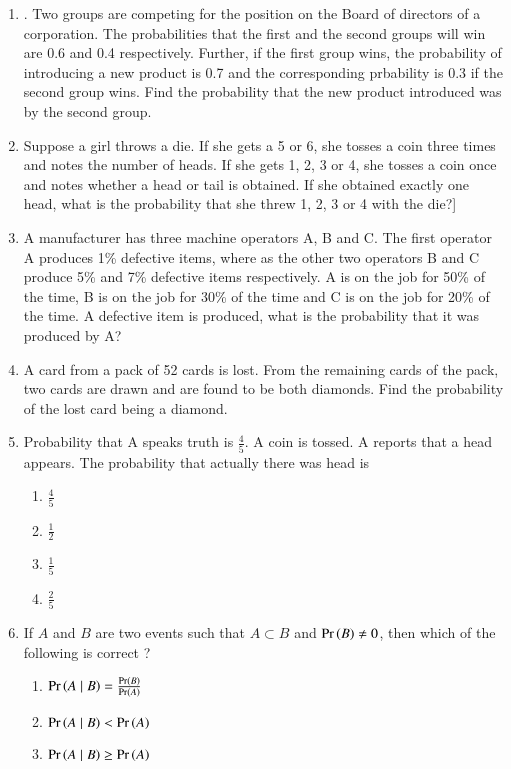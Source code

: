 \begin{enumerate}[label=\thesubsection.\arabic*,ref=\thesubsection.\theenumi]
\item. Two groups are competing for the position on the Board of directors of a
corporation. The probabilities that the first and the second groups will win are
0.6 and 0.4 respectively. Further, if the first group wins, the probability of
introducing a new product is 0.7 and the corresponding prbability is 0.3 if the
second group wins. Find the probability that the new product introduced was by
the second group.
\\
\solution
%
\item Suppose a girl throws a die. If she gets a 5 or 6, she tosses a coin three times and
notes the number of heads. If she gets 1, 2, 3 or 4, she tosses a coin once and
notes whether a head or tail is obtained. If she obtained exactly one head, what
is the probability that she threw 1, 2, 3 or 4 with the die?]
\item A manufacturer has three machine operators A, B and C. The first operator A
produces 1\% defective items, where as the other two operators B and C produce 5\% and 7\% defective items respectively. A is on the job for 50\% of the
time, B is on the job for 30\% of the time and C is on the job for 20\% of the time.
A defective item is produced, what is the probability that it was produced by A?
\item A card from a pack of 52 cards is lost. From the remaining cards of the pack,
two cards are drawn and are found to be both diamonds. Find the probability of
the lost card being a diamond.
%
\item Probability that A speaks truth is
$\frac{4}{5}$. A coin is tossed. A reports that a head
appears. The probability that actually there was head is
\begin{enumerate}
\item $\frac{4}{5}$ 
\item $\frac{1}{2}$ 
\item $\frac{1}{5}$ 
\item $\frac{2}{5}$
\end{enumerate}
\solution
%
\item 
		If $A$ and $B$ are two events such that $A \subset B$ and $\Pr\left(B\right) \neq 0$, then which of the following is correct ?
\begin{enumerate}
\item $\Pr\left(A \mid B\right) = \frac{\Pr\left(B\right)}{\Pr\left(A\right)}$ 
\item $\Pr\left(A \mid B\right) < \Pr\left(A\right)$
\item $\Pr\left(A \mid B\right) \geq \Pr\left(A\right)$  

\end{enumerate}
\end{enumerate}
